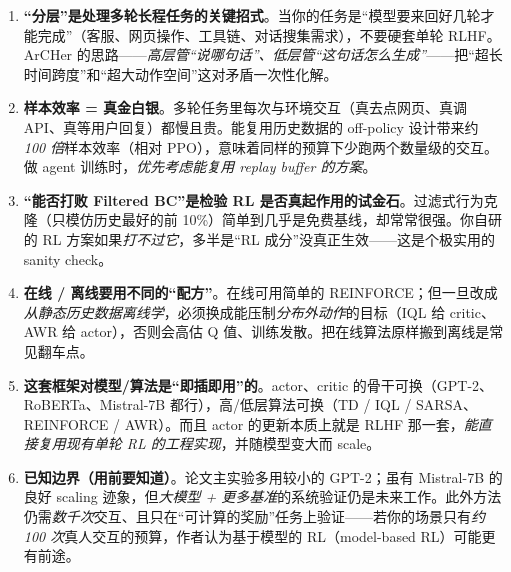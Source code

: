 \documentclass[11pt,UTF8,fontset=fandol]{ctexart}
\begin{document}
\begin{enumerate}[leftmargin=1.6em]
\item \textbf{“分层”是处理多轮长程任务的关键招式}。当你的任务是“模型要来回好几轮才能完成”（客服、网页操作、工具链、对话搜集需求），不要硬套单轮 RLHF。ArCHer 的思路——\emph{高层管“说哪句话”、低层管“这句话怎么生成”}——把“超长时间跨度”和“超大动作空间”这对矛盾一次性化解。

\item \textbf{样本效率 = 真金白银}。多轮任务里每次与环境交互（真去点网页、真调 API、真等用户回复）都慢且贵。能复用历史数据的 off-policy 设计带来约 \emph{100 倍}样本效率（相对 PPO），意味着同样的预算下少跑两个数量级的交互。做 agent 训练时，\emph{优先考虑能复用 replay buffer 的方案}。

\item \textbf{“能否打败 Filtered BC”是检验 RL 是否真起作用的试金石}。过滤式行为克隆（只模仿历史最好的前 10\%）简单到几乎是免费基线，却常常很强。你自研的 RL 方案如果\emph{打不过它}，多半是“RL 成分”没真正生效——这是个极实用的 sanity check。

\item \textbf{在线 / 离线要用不同的“配方”}。在线可用简单的 REINFORCE；但一旦改成\emph{从静态历史数据离线学}，必须换成能压制\emph{分布外动作}的目标（IQL 给 critic、AWR 给 actor），否则会高估 Q 值、训练发散。把在线算法原样搬到离线是常见翻车点。

\item \textbf{这套框架对模型/算法是“即插即用”的}。actor、critic 的骨干可换（GPT-2、RoBERTa、Mistral-7B 都行），高/低层算法可换（TD / IQL / SARSA、REINFORCE / AWR）。而且 actor 的更新本质上就是 RLHF 那一套，\emph{能直接复用现有单轮 RL 的工程实现}，并随模型变大而 scale。

\item \textbf{已知边界（用前要知道）}。论文主实验多用较小的 GPT-2；虽有 Mistral-7B 的良好 scaling 迹象，但\emph{大模型 + 更多基准}的系统验证仍是未来工作。此外方法仍需\emph{数千次}交互、且只在“可计算的奖励”任务上验证——若你的场景只有\emph{约 100 次}真人交互的预算，作者认为基于模型的 RL（model-based RL）可能更有前途。
\end{enumerate}
\end{document}
